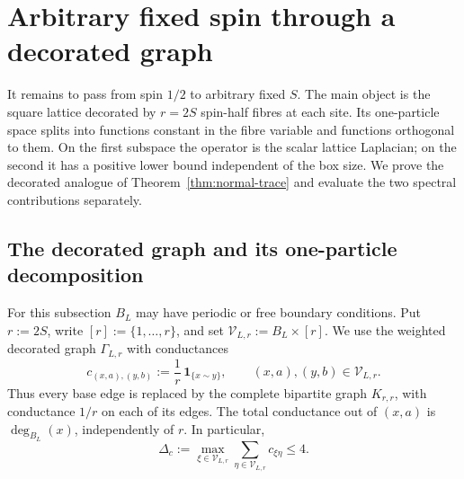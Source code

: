 \documentclass[11pt]{article}
\numberwithin{equation}{section}
\theoremstyle{remark}
\newcommand{\1}{\mathbf 1}
\begin{document}
\section{Arbitrary fixed spin through a decorated graph}
\label{sec:fixed-spin}

It remains to pass from spin \(1/2\) to arbitrary fixed \(S\).  The main
object is the square lattice decorated by \(r=2S\) spin-half fibres at
each site.  Its one-particle space splits into functions constant in the
fibre variable and functions orthogonal to them.  On the first subspace the
operator is the scalar lattice Laplacian; on the second it has a positive
lower bound independent of the box size.  We prove the decorated analogue
of Theorem~\ref{thm:normal-trace} and evaluate the two spectral contributions
separately.

\subsection{The decorated graph and its one-particle decomposition}
\label{subsec:decorated-graph}

For this subsection \(B_L\) may have periodic or free boundary conditions.
Put \(r:=2S\), write \([r]:=\{1,\ldots,r\}\), and set
\(\mathcal V_{L,r}:=B_L\times[r]\).  We use the weighted decorated graph
\(\Gamma_{L,r}\) with conductances
\begin{equation}
 c_{(x,a),(y,b)}:=\frac1r\,\1_{\{x\sim y\}},
 \qquad (x,a),(y,b)\in\mathcal V_{L,r}.
 \label{eq:decorated-conductances}
\end{equation}
Thus every base edge is replaced by the complete bipartite graph
\(K_{r,r}\), with conductance \(1/r\) on each of its edges.  The total
conductance out of \((x,a)\) is
\(\deg_{B_L}(x)\), independently of \(r\).  In particular,
\begin{equation}
 \Delta_c:=\max_{\xi\in\mathcal V_{L,r}}
 \sum_{\eta\in\mathcal V_{L,r}}c_{\xi\eta}\leq4.
 \label{eq:decorated-weighted-degree}
\end{equation}
\end{document}
